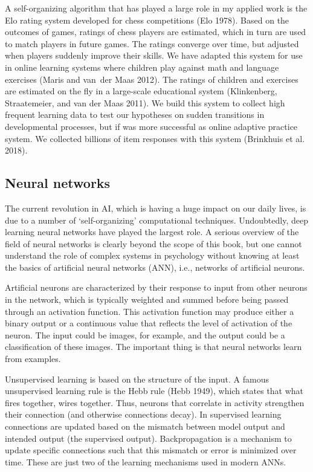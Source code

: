 \documentclass[
  a4paper,
  DIV=11,
  numbers=noendperiod,
  oneside]{scrreprt}
\begin{document}
A self-organizing algorithm that has played a large role in my applied
work is the Elo rating system developed for chess competitions (Elo
1978). Based on the outcomes of games, ratings of chess players are
estimated, which in turn are used to match players in future games. The
ratings converge over time, but adjusted when players suddenly improve
their skills. We have adapted this system for use in online learning
systems where children play against math and language exercises (Maris
and van~der Maas 2012). The ratings of children and exercises are
estimated on the fly in a large-scale educational system (Klinkenberg,
Straatemeier, and van der Maas 2011). We build this system to collect
high frequent learning data to test our hypotheses on sudden transitions
in developmental processes, but if was more successful as online
adaptive practice system. We collected billions of item responses with
this system (Brinkhuis et al. 2018).

\hypertarget{sec-Neural-networks}{%
\subsection{Neural networks}\label{sec-Neural-networks}}

The current revolution in AI, which is having a huge impact on our daily
lives, is due to a number of `self-organizing' computational techniques.
Undoubtedly, deep learning neural networks have played the largest role.
A serious overview of the field of neural networks is clearly beyond the
scope of this book, but one cannot understand the role of complex
systems in psychology without knowing at least the basics of artificial
neural networks (ANN), i.e., networks of artificial neurons.

Artificial neurons are characterized by their response to input from
other neurons in the network, which is typically weighted and summed
before being passed through an activation function. This activation
function may produce either a binary output or a continuous value that
reflects the level of activation of the neuron. The input could be
images, for example, and the output could be a classification of these
images. The important thing is that neural networks learn from examples.

Unsupervised learning is based on the structure of the input. A famous
unsupervised learning rule is the Hebb rule (Hebb 1949), which states
that what fires together, wires together. Thus, neurons that correlate
in activity strengthen their connection (and otherwise connections
decay). In supervised learning connections are updated based on the
mismatch between model output and intended output (the supervised
output). Backpropagation is a mechanism to update specific connections
such that this mismatch or error is minimized over time. These are just
two of the learning mechanisms used in modern ANNs.
\end{document}
